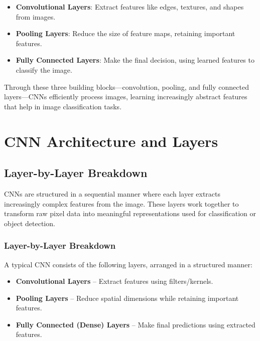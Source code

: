 \documentclass[
  letterpaper,
  DIV=11,
  numbers=noendperiod]{scrreprt}
\providecommand{\tightlist}{%
  \setlength{\itemsep}{0pt}\setlength{\parskip}{0pt}}\usepackage{longtable,booktabs,array}
\begin{document}
\begin{itemize}
\tightlist
\item
  \textbf{Convolutional Layers}: Extract features like edges, textures,
  and shapes from images.
\item
  \textbf{Pooling Layers}: Reduce the size of feature maps, retaining
  important features.
\item
  \textbf{Fully Connected Layers}: Make the final decision, using
  learned features to classify the image.
\end{itemize}

Through these three building blocks---convolution, pooling, and fully
connected layers---CNNs efficiently process images, learning
increasingly abstract features that help in image classification tasks.

\section{CNN Architecture and Layers}\label{cnn-architecture-and-layers}

\subsection{Layer-by-Layer Breakdown}\label{layer-by-layer-breakdown}

CNNs are structured in a sequential manner where each layer extracts
increasingly complex features from the image. These layers work together
to transform raw pixel data into meaningful representations used for
classification or object detection.

\subsubsection{Layer-by-Layer
Breakdown}\label{layer-by-layer-breakdown-1}

A typical CNN consists of the following layers, arranged in a structured
manner:

\begin{itemize}
\tightlist
\item
  \textbf{Convolutional Layers} -- Extract features using
  filters/kernels.
\item
  \textbf{Pooling Layers} -- Reduce spatial dimensions while retaining
  important features.
\item
  \textbf{Fully Connected (Dense) Layers} -- Make final predictions
  using extracted features.
\end{itemize}
\end{document}
